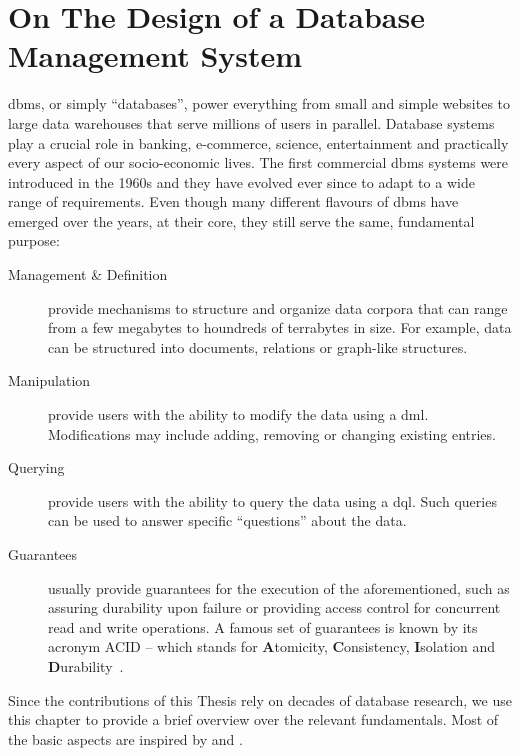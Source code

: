 \chapter{On The Design of a Database Management System}
\label{chapter:theory_databases}


\gls{dbms}{}, or simply ``databases'', power everything from small and simple websites to large data warehouses that serve millions of users in parallel. Database systems play a crucial role in banking, e-commerce, science, entertainment and practically every aspect of our socio-economic lives. The first commercial \gls{dbms} systems were introduced in the 1960s \cite{Garcia:2009Database} and they have evolved ever since to adapt to a wide range of requirements. Even though many different flavours of \gls{dbms} have emerged over the years, at their core, they still serve the same, fundamental purpose:

\begin{description}
    \item[Management \& Definition]  provide mechanisms to structure and organize data corpora that can range from a few megabytes to houndreds of terrabytes in size. For example, data can be structured into documents, relations or graph-like structures.
    \item[Manipulation]  provide users with the ability to modify the data using a \gls{dml}. Modifications may include adding, removing or changing existing entries.
    \item[Querying]  provide users with the ability to query the data using a \gls{dql}. Such queries can be used to answer specific ``questions'' about the data.
    \item[Guarantees]  usually provide guarantees for the execution of the aforementioned, such as assuring durability upon failure or providing access control for concurrent read and write operations. A famous set of guarantees is known by its acronym ACID -- which stands for \textbf{A}tomicity, \textbf{C}onsistency, \textbf{I}solation and \textbf{D}urability~\cite{Haerder:1983principles}.
\end{description}

Since the contributions of this Thesis rely on decades of database research, we use this chapter to provide a brief overview over the relevant fundamentals. Most of the basic aspects are inspired by \cite{Garcia:2009Database} and \cite{Petrov:2019Database}.


